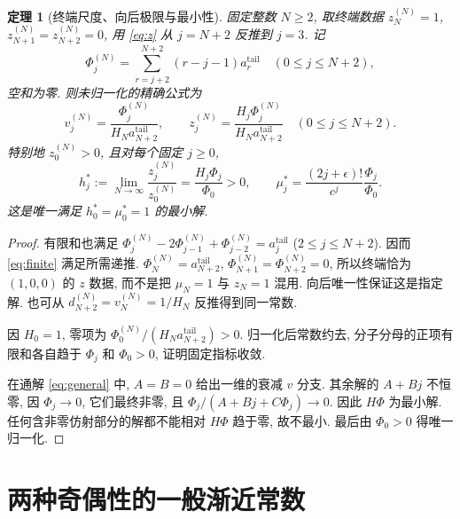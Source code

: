 \documentclass[UTF8]{ctexart}
\newtheorem{theorem}{定理}[section]
\newcommand{\eps}{\epsilon}
\begin{document}
\begin{theorem}[终端尺度、向后极限与最小性]\label{thm:minimal2}
 固定整数 $N\ge2$, 取终端数据
 $z_N^{(N)}=1$, $z_{N+1}^{(N)}=z_{N+2}^{(N)}=0$,
 用 \eqref{eq:z} 从 $j=N+2$ 反推到 $j=3$. 记
\[
 \Phi_j^{(N)}=\sum_{r=j+2}^{N+2}(r-j-1)a_r^{\mathrm{tail}}
 \quad(0\le j\le N+2),
\]
 空和为零. 则未归一化的精确公式为
\begin{equation}\label{eq:finite}
 v_j^{(N)}=\frac{\Phi_j^{(N)}}{H_N a_{N+2}^{\mathrm{tail}}},\qquad
 z_j^{(N)}=\frac{H_j\Phi_j^{(N)}}{H_N a_{N+2}^{\mathrm{tail}}}
 \quad(0\le j\le N+2).
\end{equation}
 特别地 $z_0^{(N)}>0$, 且对每个固定 $j\ge0$,
\begin{equation}\label{eq:minimal}
 h_j^*:=\lim_{N\to\infty}\frac{z_j^{(N)}}{z_0^{(N)}}
 =\frac{H_j\Phi_j}{\Phi_0}>0,\qquad
 \mu_j^*=\frac{(2j+\eps)!}{c^j}\frac{\Phi_j}{\Phi_0}.
\end{equation}
 这是唯一满足 $h_0^*=\mu_0^*=1$ 的最小解.
\end{theorem}
\begin{proof}
 有限和也满足 $\Phi_j^{(N)}-2\Phi_{j-1}^{(N)}+\Phi_{j-2}^{(N)}
 =a_j^{\mathrm{tail}}$ ($2\le j\le N+2$).
 因而 \eqref{eq:finite} 满足所需递推.
 $\Phi_N^{(N)}=a_{N+2}^{\mathrm{tail}}$,
 $\Phi_{N+1}^{(N)}=\Phi_{N+2}^{(N)}=0$, 所以终端恰为 $(1,0,0)$
 的 $z$ 数据, 而不是把 $\mu_N=1$ 与 $z_N=1$ 混用.
 向后唯一性保证这是指定解. 也可从
 $d_{N+2}^{(N)}=v_N^{(N)}=1/H_N$ 反推得到同一常数.

 因 $H_0=1$, 零项为 $\Phi_0^{(N)}/(H_N a_{N+2}^{\mathrm{tail}})>0$.
 归一化后常数约去, 分子分母的正项有限和各自趋于
 $\Phi_j$ 和 $\Phi_0>0$, 证明固定指标收敛.

 在通解 \eqref{eq:general} 中, $A=B=0$ 给出一维的衰减 $v$ 分支.
 其余解的 $A+Bj$ 不恒零, 因 $\Phi_j\to0$, 它们最终非零,
 且 $\Phi_j/(A+Bj+C\Phi_j)\to0$.
 因此 $H\Phi$ 为最小解. 任何含非零仿射部分的解都不能相对 $H\Phi$
 趋于零, 故不最小. 最后由 $\Phi_0>0$ 得唯一归一化.
\end{proof}

\section{两种奇偶性的一般渐近常数}\label{sec:K}
\end{document}
